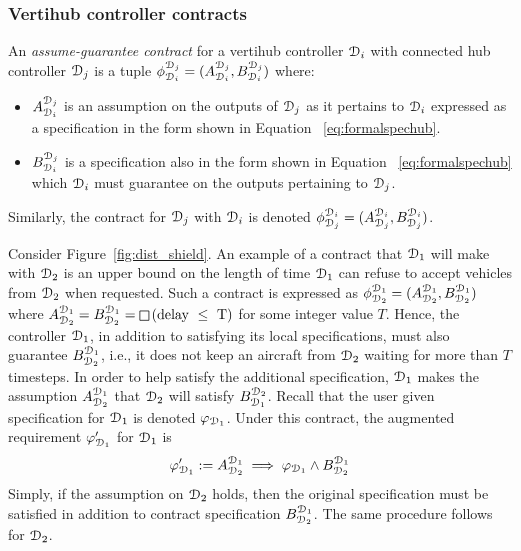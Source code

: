 \subsubsection{Vertihub controller contracts}
 An \emph{assume-guarantee contract} for a vertihub controller $\mathcal{D}_i$ with connected hub controller $\mathcal{D}_j$ is a tuple $\mathcal \phi_{\mathcal{D}_i}^{\mathcal{D}_j} = (A_{\mathcal{D}_i}^{\mathcal{D}_j},B_{\mathcal{D}_i}^{\mathcal{D}_j})$ where:
\begin{itemize}
\item $A_{\mathcal{D}_i}^{\mathcal{D}_j}$ is an assumption on the outputs of $\mathcal{D}_j$ as it pertains to ${\mathcal{D}_i}$ expressed as a specification in the form shown in Equation ~\eqref{eq:formalspechub}. 
\item $B_{\mathcal{D}_i}^{\mathcal{D}_j}$ is a specification also in the form shown in Equation ~\eqref{eq:formalspechub}  which $\mathcal{D}_i$ must guarantee on the outputs pertaining to $\mathcal{D}_j$.
\end{itemize}
Similarly, the contract for $\mathcal{D}_j$ with $\mathcal{D}_i$ is denoted $\mathcal \phi_{\mathcal{D}_j}^{\mathcal{D}_i} = (A_{\mathcal{D}_j}^{\mathcal{D}_i},B_{\mathcal{D}_j}^{\mathcal{D}_i})$.


\begin{eg}
Consider Figure~\ref{fig:dist_shield}. An example of a contract that $\mathcal{D}_1$ will make with $\mathcal{D}_2$ is an upper bound on the length of time $\mathcal{D}_1$ can refuse to accept vehicles from $\mathcal{D}_2$ when requested. Such a contract is expressed as $\phi_{\mathcal{D}_2}^{\mathcal{D}_1}= (A_{\mathcal{D}_2}^{\mathcal{D}_1},B_{\mathcal{D}_2}^{\mathcal{D}_1})$ where $A_{\design_2}^{\design_1} = B_{\design_2}^{\design_1} = \LTLglobally \left(\text{delay } \leq \text{ T}\right)$ for some integer value $T$. Hence, the controller $\mathcal{D}_1$, in addition to satisfying its local specifications, must also guarantee $B_{\mathcal{D}_2}^{\mathcal{D}_1}$, i.e., it does not keep an aircraft from $\mathcal{D}_2$ waiting for more than $T$ timesteps. In order to help satisfy the additional specification, $\mathcal{D}_1$ makes the assumption $A_{\mathcal{D}_2}^{\mathcal{D}_1}$ that $\mathcal{D}_2$ will satisfy $B_{\mathcal{D}_1}^{\mathcal{D}_2}$. Recall that the user given specification for $\mathcal{D}_1$ is denoted $\varphi_{\mathcal{D}_1}$. Under this contract, the augmented requirement $\varphi_{\mathcal{D}_1}'$ for $\mathcal{D}_1$ is
$$ \varphi_{\mathcal{D}_1}' := A_{\mathcal{D}_2}^{\mathcal{D}_1} \implies \varphi_{\mathcal{D}_1} \wedge B_{\mathcal{D}_2}^{\mathcal{D}_1} $$
Simply, if the assumption on $\mathcal{D}_2$ holds, then the original specification must be satisfied in addition to contract specification $B_{\mathcal{D}_2}^{\mathcal{D}_1}$. The same procedure follows for $\mathcal{D}_2$. \end{eg}


